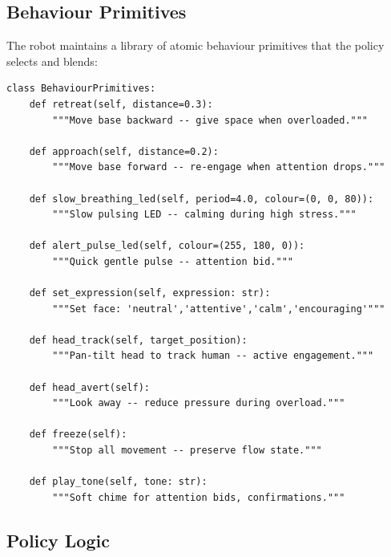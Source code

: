 \documentclass[11pt,a4paper]{article}
\begin{document}
\subsection{Behaviour Primitives}

The robot maintains a library of atomic behaviour primitives that the policy selects and blends:

\begin{lstlisting}[caption={Behaviour primitives (Python, v1 rule-based).}, label={lst:primitives}]
class BehaviourPrimitives:
    def retreat(self, distance=0.3):
        """Move base backward -- give space when overloaded."""

    def approach(self, distance=0.2):
        """Move base forward -- re-engage when attention drops."""

    def slow_breathing_led(self, period=4.0, colour=(0, 0, 80)):
        """Slow pulsing LED -- calming during high stress."""

    def alert_pulse_led(self, colour=(255, 180, 0)):
        """Quick gentle pulse -- attention bid."""

    def set_expression(self, expression: str):
        """Set face: 'neutral','attentive','calm','encouraging'"""

    def head_track(self, target_position):
        """Pan-tilt head to track human -- active engagement."""

    def head_avert(self):
        """Look away -- reduce pressure during overload."""

    def freeze(self):
        """Stop all movement -- preserve flow state."""

    def play_tone(self, tone: str):
        """Soft chime for attention bids, confirmations."""
\end{lstlisting}

\subsection{Policy Logic}
\end{document}
